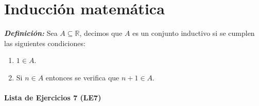 \documentclass[11pt]{article}
\newcommand{\R}{\mathbb{R}}
\newcommand{\bfit}[1]{\textbf{\textit{#1}}}
\let\subset\subseteq
\begin{document}
\pagebreak

\part*{Inducción matemática}

\bfit{Definición:}  Sea $A\subset \R$, decimos que $A$ es un conjunto inductivo si se cumplen las siguientes condiciones:
    \begin{enumerate}[label=\roman*)]
        \item $1 \in A$.
        \item Si $n \in A$ entonces se verifica que $n+1 \in A$.
    \end{enumerate}

\subsection*{Lista de Ejercicios 7 (LE7)}
\end{document}
